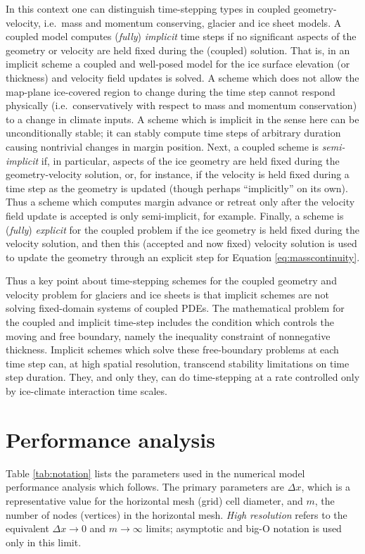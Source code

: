 \documentclass[review]{igs}
\begin{document}
In this context one can distinguish time-stepping types in coupled geometry-velocity, i.e.~mass and momentum conserving, glacier and ice sheet models.  A coupled model computes (\emph{fully}) \emph{implicit} time steps if no significant aspects of the geometry or velocity are held fixed during the (coupled) solution.  That is, in an implicit scheme a coupled and well-posed model for the ice surface elevation (or thickness) and velocity field updates is solved.  A scheme which does not allow the map-plane ice-covered region to change during the time step cannot respond physically (i.e.~conservatively with respect to mass and momentum conservation) to a change in climate inputs.  A scheme which is implicit in the sense here can be unconditionally stable; it can stably compute time steps of arbitrary duration causing nontrivial changes in margin position.  Next, a coupled scheme is \emph{semi-implicit} if, in particular, aspects of the ice geometry are held fixed during the geometry-velocity solution, or, for instance, if the velocity is held fixed during a time step as the geometry is updated (though perhaps ``implicitly'' on its own).  Thus a scheme which computes margin advance or retreat only after the velocity field update is accepted is only semi-implicit, for example.  Finally, a scheme is (\emph{fully}) \emph{explicit} for the coupled problem if the ice geometry is held fixed during the velocity solution, and then this (accepted and now fixed) velocity solution is used to update the geometry through an explicit step for Equation \eqref{eq:masscontinuity}.

Thus a key point about time-stepping schemes for the coupled geometry and velocity problem for glaciers and ice sheets is that implicit schemes are not solving fixed-domain systems of coupled PDEs.  The mathematical problem for the coupled and implicit time-step includes the condition which controls the moving and free boundary, namely the inequality constraint of nonnegative thickness.  Implicit schemes which solve these free-boundary problems at each time step can, at high spatial resolution, transcend stability limitations on time step duration.  They, and only they, can do time-stepping at a rate controlled only by ice-climate interaction time scales.


\section{Performance analysis}

Table \ref{tab:notation} lists the parameters used in the numerical model performance analysis which follows.  The primary parameters are $\Delta x$, which is a representative value for the horizontal mesh (grid) cell diameter, and $m$, the number of nodes (vertices) in the horizontal mesh.  \emph{High resolution} refers to the equivalent $\Delta x\to 0$ and $m\to\infty$ limits; asymptotic and big-O notation is used only in this limit.
\end{document}
